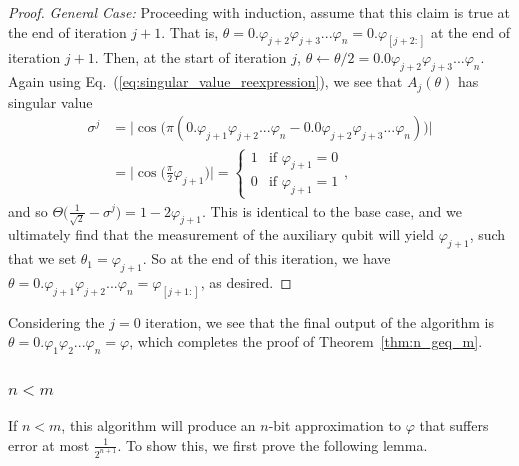\documentclass[aps,pra,showpacs,notitlepage,twocolumn,superscriptaddress,nofootinbib]{revtex4-1}
\begin{document}
\begin{proof}
\textit{General Case:} Proceeding with induction, assume that this claim is true at the end of iteration $j+1$. That is, $\theta = 0.\varphi_{j+2} \varphi_{j+3} ... \varphi_n = 0.\varphi_{[j+2:]}$ at the end of iteration $j+1$. Then, at the start of iteration $j$, $\theta \leftarrow \theta/2 = 0.0\varphi_{j+2} \varphi_{j+3} ... \varphi_n$. Again using Eq.~(\ref{eq:singular_value_reexpression}), we see that $A_j(\theta)$ has singular value
\begin{equation}
\begin{split}
    \sigma^{j} &= \big|\cos\big(\pi (0.\varphi_{j+1} \varphi_{j+2} ... \varphi_n-0.0\varphi_{j+2} \varphi_{j+3} ... \varphi_n) \big) \big|\\ &=
    \Big| \cos\Big( \frac{\pi}{2}\varphi_{j+1} \Big) \Big|= 
    \begin{cases}
        1 & \text{if } \varphi_{j+1} = 0 \\
        0 & \text{if } \varphi_{j+1} = 1
    \end{cases},
\end{split}
\end{equation}
and so $\Theta\Big(\frac{1}{\sqrt{2}}-\sigma^{j}\Big) = 1-2\varphi_{j+1}$. This is identical to the base case, and we ultimately find that the measurement of the auxiliary qubit will yield $\varphi_{j+1}$, such that we set $\theta_1 = \varphi_{j+1}$. So at the end of this iteration, we have $\theta = 0.\varphi_{j+1}\varphi_{j+2}...\varphi_{n} = \varphi_{[j+1:]}$, as desired. 
\end{proof} 


Considering the $j=0$ iteration, we see that the final output of the algorithm is $\theta = 0.\varphi_1 \varphi_2 ... \varphi_n = \varphi$, which completes the proof of Theorem~\ref{thm:n_geq_m}.  


\subsubsection{$n<m$}\label{sec:n_l_m}
If $n<m$, this algorithm will produce an $n$-bit approximation to $\varphi$ that suffers error at most $\frac{1}{2^{n+1}}$. To show this, we first prove the following lemma.
\end{document}

